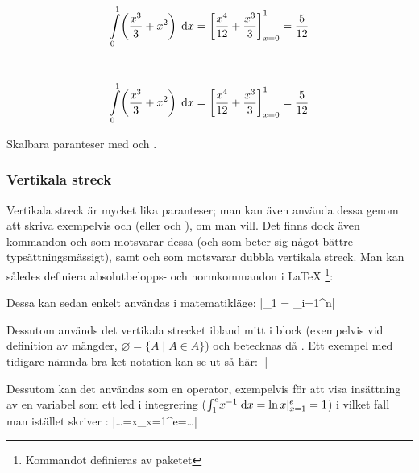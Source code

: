 \documentclass[10pt,../../a4.tex]{subfiles}
\begin{document}
\begin{kod}[tbp]
	\centering 
	\begin{minipage}{0.85\textwidth}
		\begin{latexcode}
\begin{equation*}
\int\limits_0^1\!\left(\dfrac{x^3}{3} +
x^2\right)\d{x} = \left[\dfrac{x^4}{12} +
\dfrac{x^3}{3}\right]_{x=0}^1 = \dfrac{5}{12}
\end{equation*}
		\end{latexcode}
	\end{minipage}
	\\
	\begin{equation*}
		\displaystyle\int\limits_0^1\!\left(\dfrac{x^3}{3} +
		x^2\right)\d{x} = \left[\dfrac{x^4}{12} + 
		\dfrac{x^3}{3}\right]_{x=0}^1 = \dfrac{5}{12}
	\end{equation*}
	\caption{Skalbara paranteser med  och .}
	\label{ex:paranteser}
\end{kod}

\subsubsection{Vertikala streck}
Vertikala streck är mycket lika paranteser; man kan även använda dessa
genom att skriva exempelvis  och  (eller
 och ), om man
vill. Det
finns dock även kommandon  och  som motsvarar dessa
(och som beter sig något bättre typsättningsmässigt),
samt  och  som motsvarar dubbla vertikala streck.
Man kan således definiera absolutbelopps- och normkommandon i \LaTeX%
\footnote{Kommandot  definieras av paketet
}:
\begin{latexcode}
\DeclarePairedDelimiter\abs{\lvert}{\rvert}
\DeclarePairedDelimiter\norm{\lVert}{\rVert}
\end{latexcode}
\label{cmd:declarepaireddelimiter}
Dessa kan sedan enkelt användas i matematikläge:
\latex|_1 = \sum_{i=1}^n|

Dessutom används det vertikala strecket ibland mitt i block (exempelvis
vid definition av mängder, \(\varnothing = \{A \mid A \in A\}\)) och
betecknas då . Ett exempel med tidigare nämnda bra-ket-notation
kan se ut så här: \label{sec:3:mid}
\latex|\left\langle\psi\mid\Psi\right\rangle|

Dessutom kan det användas som en operator,
exempelvis för att visa insättning av en variabel som ett led i
integrering (\(\int_1^e\! x^{-1}\d{x}=\ln x\vert_{x=1}^e=1 \)) i vilket
fall man istället skriver :
\latex|\ldots=\ln x\vert_{x=1}^e=\ldots|
\end{document}
